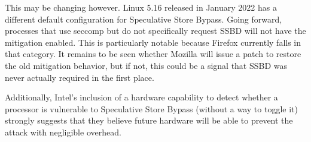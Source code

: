 This may be changing however.
Linux 5.16 released in January 2022 has a different default configuration for Speculative Store Bypass.
Going forward, processes that use seccomp but do not specifically request SSBD will not have the mitigation enabled.
This is particularly notable because Firefox currently falls in that category.
It remains to be seen whether Mozilla will issue a patch to restore the old mitigation behavior, but if not, this could be a signal that SSBD was never actually required in the first place.

Additionally, Intel's inclusion of a hardware capability to detect whether a
processor is vulnerable to Speculative Store Bypass (without a way to toggle it) strongly
suggests that they believe future hardware will be able to prevent
the attack with negligible overhead.






